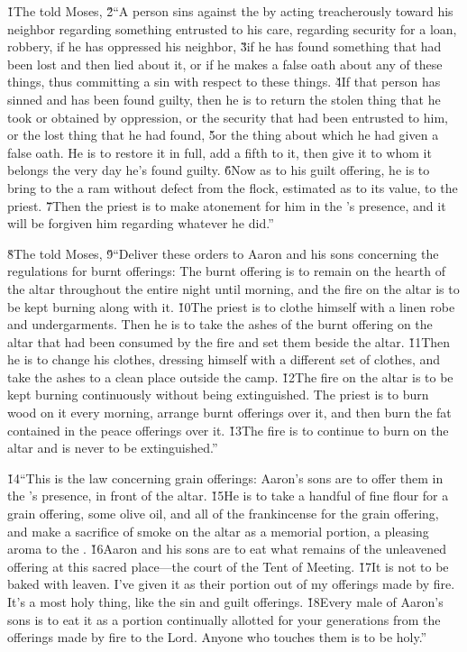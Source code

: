 \v{1}The  told Moses, \v{2}``A person sins against the  by acting treacherously toward his neighbor regarding something entrusted to his care, regarding security for a loan, robbery, if he has oppressed his neighbor, \v{3}if he has found something that had been lost and then lied about it, or if he makes a false oath about any of these things, thus committing a sin with respect to these things. \v{4}If that person has sinned and has been found guilty, then he is to return the stolen thing that he took or obtained by oppression, or the security that had been entrusted to him, or the lost thing that he had found, \v{5}or the thing about which he had given a false oath. He is to restore it in full, add a fifth to it, then give it to whom it belongs the very day he's found guilty. \v{6}Now as to his guilt offering, he is to bring to the  a ram without defect from the flock, estimated as to its value, to the priest. \v{7}Then the priest is to make atonement for him in the 's presence, and it will be forgiven him regarding whatever he did.''

\v{8}The  told Moses, \v{9}``Deliver these orders to Aaron and his sons concerning the regulations for burnt offerings: The burnt offering is to remain on the hearth of the altar throughout the entire night until morning, and the fire on the altar is to be kept burning along with it. \v{10}The priest is to clothe himself with a linen robe and undergarments. Then he is to take the ashes of the burnt offering on the altar that had been consumed by the fire and set them beside the altar. \v{11}Then he is to change his clothes, dressing himself with a different set of clothes, and take the ashes to a clean place outside the camp. \v{12}The fire on the altar is to be kept burning continuously without being extinguished. The priest is to burn wood on it every morning, arrange burnt offerings over it, and then burn the fat contained in the peace offerings over it. \v{13}The fire is to continue to burn on the altar and is never to be extinguished.''

\v{14}``This is the law concerning grain offerings: Aaron's sons are to offer them in the 's presence, in front of the altar. \v{15}He is to take a handful of fine flour for a grain offering, some olive oil, and all of the frankincense for the grain offering, and make a sacrifice of smoke on the altar as a memorial portion, a pleasing aroma to the . \v{16}Aaron and his sons are to eat what remains of the unleavened offering at this sacred place---the court of the Tent of Meeting. \v{17}It is not to be baked with leaven. I've given it as their portion out of my offerings made by fire. It's a most holy thing, like the sin and guilt offerings. \v{18}Every male of Aaron's sons is to eat it as a portion continually allotted for your generations from the offerings made by fire to the Lord. Anyone who touches them is to be holy.''

